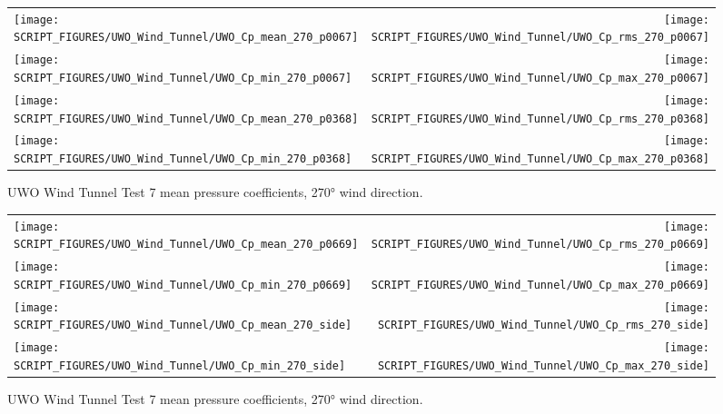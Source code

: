 \begin{figure}[p]
\begin{tabular*}{\textwidth}{l@{\extracolsep{\fill}}r}
\texttt{[image: SCRIPT\_FIGURES/UWO\_Wind\_Tunnel/UWO\_Cp\_mean\_270\_p0067]} &
\texttt{[image: SCRIPT\_FIGURES/UWO\_Wind\_Tunnel/UWO\_Cp\_rms\_270\_p0067]} \\
\texttt{[image: SCRIPT\_FIGURES/UWO\_Wind\_Tunnel/UWO\_Cp\_min\_270\_p0067]} &
\texttt{[image: SCRIPT\_FIGURES/UWO\_Wind\_Tunnel/UWO\_Cp\_max\_270\_p0067]} \\
\texttt{[image: SCRIPT\_FIGURES/UWO\_Wind\_Tunnel/UWO\_Cp\_mean\_270\_p0368]} &
\texttt{[image: SCRIPT\_FIGURES/UWO\_Wind\_Tunnel/UWO\_Cp\_rms\_270\_p0368]} \\
\texttt{[image: SCRIPT\_FIGURES/UWO\_Wind\_Tunnel/UWO\_Cp\_min\_270\_p0368]} &
\texttt{[image: SCRIPT\_FIGURES/UWO\_Wind\_Tunnel/UWO\_Cp\_max\_270\_p0368]}
\end{tabular*}
\caption[UWO Wind Tunnel Test 7 Pressure Coefficients, 270\si{\degree}]{UWO Wind Tunnel Test 7 mean pressure coefficients, 270\si{\degree} wind direction.}
\label{UWO_Test_7_pressure_coefficients_270_1}
\end{figure}

\begin{figure}[p]
\begin{tabular*}{\textwidth}{l@{\extracolsep{\fill}}r}
\texttt{[image: SCRIPT\_FIGURES/UWO\_Wind\_Tunnel/UWO\_Cp\_mean\_270\_p0669]} &
\texttt{[image: SCRIPT\_FIGURES/UWO\_Wind\_Tunnel/UWO\_Cp\_rms\_270\_p0669]} \\
\texttt{[image: SCRIPT\_FIGURES/UWO\_Wind\_Tunnel/UWO\_Cp\_min\_270\_p0669]} &
\texttt{[image: SCRIPT\_FIGURES/UWO\_Wind\_Tunnel/UWO\_Cp\_max\_270\_p0669]} \\
\texttt{[image: SCRIPT\_FIGURES/UWO\_Wind\_Tunnel/UWO\_Cp\_mean\_270\_side]} &
\texttt{[image: SCRIPT\_FIGURES/UWO\_Wind\_Tunnel/UWO\_Cp\_rms\_270\_side]}  \\
\texttt{[image: SCRIPT\_FIGURES/UWO\_Wind\_Tunnel/UWO\_Cp\_min\_270\_side]} &
\texttt{[image: SCRIPT\_FIGURES/UWO\_Wind\_Tunnel/UWO\_Cp\_max\_270\_side]}
\end{tabular*}
\caption[UWO Wind Tunnel Test 7 Pressure Coefficients, 270\si{\degree}]{UWO Wind Tunnel Test 7 mean pressure coefficients, 270\si{\degree} wind direction.}
\label{UWO_Test_7_pressure_coefficients_270_2}
\end{figure}




